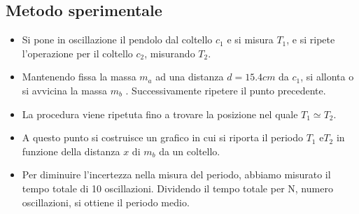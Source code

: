 \subsection{Metodo sperimentale}
\begin{itemize}

\item Si pone in oscillazione il pendolo dal coltello $c_1$ e si misura $T_1$, e si ripete l'operazione per il coltello $c_2$, misurando $T_2$. 
\item Mantenendo fissa la massa $m_a$ ad una distanza $d = 15.4cm$ da $c_1$,  si allonta o si avvicina la massa $m_b$ . Successivamente ripetere il punto precedente. 
\item La procedura viene ripetuta fino a trovare la posizione nel quale $T_1 \simeq T_2$. 
\item A questo punto si costruisce un grafico in cui si riporta il periodo $T_1$ e$ T_2 $ in funzione della distanza $x$ di $m_b$ da un coltello. 
\item Per diminuire l'incertezza nella misura del periodo, abbiamo misurato il tempo totale di 10 oscillazioni. Dividendo il tempo totale per N, numero oscillazioni, si ottiene il periodo medio. 

\end{itemize}


